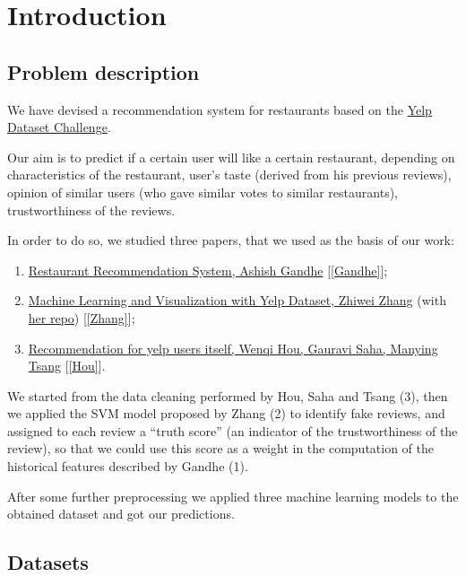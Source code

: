 
\section{Introduction}

\subsection{Problem description} \label{sec:problem}

We have devised a recommendation system for restaurants based on the \href{https://www.yelp.com/dataset/challenge}{Yelp Dataset Challenge}.

Our aim is to predict if a certain user will like a certain restaurant, depending on characteristics of the restaurant, user's taste (derived from his previous reviews), opinion of similar users (who gave similar votes to similar restaurants), trustworthiness of the reviews.

In order to do so, we studied three papers, that we used as the basis of our work:
\begin{enumerate}
	\item \href{https://www.semanticscholar.org/paper/Restaurant-Recommendation-System-Gandhe/093cecc3e53f2ba4c0c466ad3d8294ba64962050}{Restaurant Recommendation System, Ashish Gandhe} [\ref{Gandhe}];
	\item \href{https://medium.com/@zhiwei_zhang/final-blog-642fb9c7e781}{Machine Learning and Visualization with Yelp Dataset, Zhiwei Zhang} (with \href{https://github.com/zzhang83/Yelp_Sentiment_Analysis}{her repo}) [\ref{Zhang}];
	\item \href{https://www.kaggle.com/wenqihou828/recommendation-for-yelp-users-itself}{Recommendation for yelp users itself, Wenqi Hou, Gauravi Saha, Manying Tsang} [\ref{Hou}].
\end{enumerate}

We started from the data cleaning performed by Hou, Saha and Tsang (3), then we applied the SVM model proposed by Zhang (2) to identify fake reviews, and assigned to each review a ``truth score'' (an indicator of the trustworthiness of the review), so that we could use this score as a weight in the computation of the historical features described by Gandhe (1).

After some further preprocessing we applied three machine learning models to the obtained dataset and got our predictions.

\subsection{Datasets} \label{sec:datasets}

